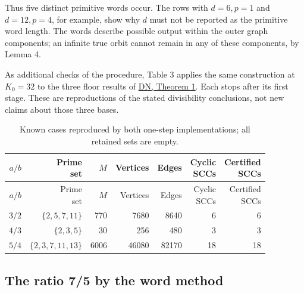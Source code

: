 \documentclass[11pt,reqno]{amsart}
\theoremstyle{definition}
\theoremstyle{remark}
\begin{document}
Thus five distinct primitive words occur. The rows with \(d=6,p=1\)
and \(d=12,p=4\), for example, show why \(d\) must not be reported as
the primitive word length. The words describe possible output within the
outer graph components; an infinite true orbit cannot remain in any of
these components, by Lemma 4.

As additional checks of the procedure, Table 3 applies the same
construction at \(K_0=32\) to the three floor results of
\hyperref[ref-dn]{DN, Theorem 1}. Each stops after its first stage. These are
reproductions of the stated divisibility conclusions, not new claims
about those three bases.


\begingroup
\small
\setlength{\tabcolsep}{4pt}
\renewcommand{\arraystretch}{1.15}
\setlength{\LTcapwidth}{\textwidth}
\begin{longtable}{@{} r r r r r r r@{}}
\caption{Known cases reproduced by both one-step
implementations; all retained sets are empty.}\label{tab:3}\\
\toprule
\(a/b\) & \shortstack[r]{Prime\\set} & \(M\) & Vertices & Edges & \shortstack[r]{Cyclic\\SCCs} & \shortstack[r]{Certified\\SCCs} \\
\midrule
\endfirsthead
\toprule
\(a/b\) & \shortstack[r]{Prime\\set} & \(M\) & Vertices & Edges & \shortstack[r]{Cyclic\\SCCs} & \shortstack[r]{Certified\\SCCs} \\
\midrule
\endhead
\bottomrule
\endlastfoot
\(3/2\) & \(\{2,\allowbreak{}5,\allowbreak{}7,\allowbreak{}11\}\) & 770 & 7680 & 8640 & 6 & 6 \\*
\(4/3\) & \(\{2,\allowbreak{}3,\allowbreak{}5\}\) & 30 & 256 & 480 & 3 & 3 \\*
\(5/4\) & \(\{2,\allowbreak{}3,\allowbreak{}7,\allowbreak{}11,\allowbreak{}13\}\) & 6006 & 46080 & 82170 & 18 & 18 \\
\end{longtable}
\endgroup

\subsection{The ratio 7/5 by the word method}\label{sec:5.2}
\end{document}
